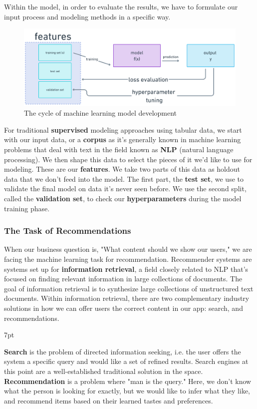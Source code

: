 \documentclass[11pt, table]{diazessay} %
\newenvironment{formal}{%
  \def\FrameCommand{%
	\hspace{1pt}%
	{\color{w_lightblue}\vrule width 2pt}%
	{\color{formalshade}\vrule width 4pt}%
	\colorbox{formalshade}%
  }%
  \MakeFramed{\advance\hsize-\width\FrameRestore}%
  \noindent\hspace{-4.55pt}%
  \begin{adjustwidth}{}{7pt}%
  \vspace{2pt}\vspace{2pt}%
}
{%
  \vspace{2pt}\end{adjustwidth}\endMakeFramed%
}
\begin{document}
\begin{sloppypar}
Within the model, in order to evaluate the results, we have to formulate our input process and modeling methods in a specific way.

\begin{figure}[H]
  \includegraphics[width=\linewidth]{figures/model_cycle.png}
  \caption{The cycle of machine learning model development}
\end{figure}

For traditional \textbf{supervised} modeling approaches using tabular data, we start with our input data, or a \textbf{corpus} as it's generally known in machine learning problems that deal with text in the field known as \textbf{NLP} (natural language processing). We then shape this data to select the pieces of it we'd like to use for modeling. These are our \textbf{features}.  We take two parts of this data as holdout data that we don't feed into the model. The first part, the \textbf{test set}, we use to validate the final model on data it's never seen before. We use the second split, called the \textbf{validation set}, to check our \textbf{hyperparameters} during the model training phase.

\subsubsection{The Task of Recommendations}

When our business question is, "What content should we show our users," we are facing the machine learning task for recommendation. Recommender systems are systems set up for \textbf{information retrieval}, a field closely related to NLP that's focused on finding relevant information in large collections of documents.   The goal of information retrieval is to synthesize large collections of unstructured text documents. Within information retrieval, there are two complementary industry solutions in how we can offer users the correct content in our app: search, and recommendations.

\begin{formal}
\textbf{Search} is the problem of directed\citep{ekstrand2019recommender} information seeking, i.e. the user offers the system a specific query and would like a set of refined results. Search engines at this point are a well-established traditional solution in the space. \textbf{Recommendation} is a problem where "man is the query."\citep{seaver2022computing}  Here, we don't know what the person is looking for exactly, but we would like to infer what they like, and recommend items based on their learned tastes and preferences.
\end{formal}


\end{sloppypar}
\end{document}
